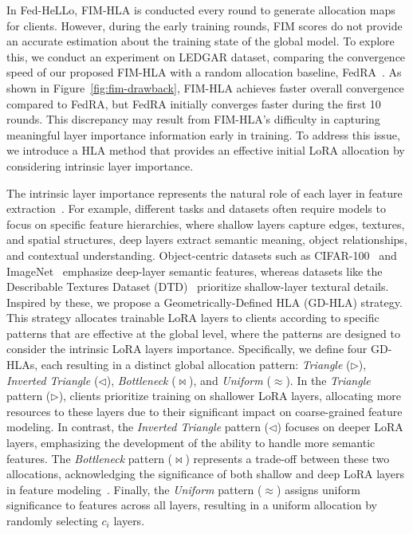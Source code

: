 \documentclass[lettersize,journal]{IEEEtran}
\begin{document}
{
In Fed-HeLLo, FIM-HLA is conducted every round to generate allocation maps for clients. However, during the early training rounds, FIM scores do not provide an accurate estimation about the training state of the global model.
To explore this, we conduct an experiment on LEDGAR dataset, comparing the convergence speed of our proposed FIM-HLA with a random allocation baseline, FedRA~\cite{su2023fedra}. As shown in Figure~\ref{fig:fim-drawback}, FIM-HLA achieves faster overall convergence compared to FedRA, but FedRA initially converges faster during the first 10 rounds. This discrepancy may result from FIM-HLA's difficulty in capturing meaningful layer importance information early in training. To address this issue, we introduce a HLA method that provides an effective initial LoRA allocation by considering intrinsic layer importance.}



{
The intrinsic layer importance represents the natural role of each layer in feature extraction~\cite{pan2024lisa,gao2024higher}. For example, different tasks and datasets often require models to focus on specific feature hierarchies, where shallow layers capture edges, textures, and spatial structures, deep layers extract semantic meaning, object relationships, and contextual understanding. Object-centric datasets such as CIFAR-100~\cite{krizhevsky2009learning} and ImageNet~\cite{deng2009imagenet} emphasize deep-layer semantic features, whereas datasets like the Describable Textures Dataset (DTD)~\cite{cimpoi2014describing} prioritize shallow-layer textural details.} 
%
Inspired by these, we propose a Geometrically-Defined HLA (GD-HLA) strategy. This strategy allocates trainable LoRA layers to clients according to specific {patterns} that are effective at the global level, where the patterns are designed to consider the intrinsic LoRA layers importance. Specifically, we define four GD-HLAs, each resulting in a distinct global allocation pattern: \textit{Triangle} ($\rhd$), \textit{Inverted Triangle} ($\lhd$), \textit{Bottleneck} ($\bowtie$), and \textit{Uniform} ($\approx$). In the \textit{Triangle} pattern ($\rhd$), clients prioritize training on shallower LoRA layers, allocating more resources to these layers due to their significant impact on coarse-grained feature modeling. In contrast, the \textit{Inverted Triangle} pattern ($\lhd$) focuses on deeper LoRA layers, emphasizing the development of the ability to handle more semantic features. The \textit{Bottleneck} pattern ($\bowtie$) represents a trade-off between these two allocations, acknowledging the significance of both shallow and deep LoRA layers in feature modeling~\cite{zeiler2014visualizing}. Finally, the \textit{Uniform} pattern ($\approx$) assigns uniform significance to features across all layers, resulting in a uniform allocation by randomly selecting $c_i$ layers. 
\end{document}
